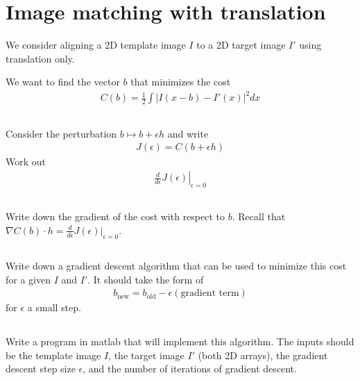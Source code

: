 \documentclass[17pt,landscape]{extarticle}
\begin{document}
\section{Image matching with translation}

We consider aligning a 2D template image $I$ to a 2D target image $I'$ using translation only.

We want to find the vector $b$ that minimizes the cost
\begin{align*}
C(b) = \frac12 \int |I(x - b)  - I'(x)|^2 dx
\end{align*}

\subsection{}
Consider the perturbation $b \mapsto b + \epsilon h$ and write
\begin{align*}
J(\epsilon) = C(b + \epsilon h)
\end{align*}
Work out
\begin{align*}
\left. \frac{d}{d\epsilon}  J(\epsilon ) \right|_{\epsilon = 0}
\end{align*}

\subsection{}
Write down the gradient of the cost with respect to $b$.  Recall that $\nabla C(b) \cdot h = \frac{d}{d\epsilon} J(\epsilon)\big|_{\epsilon = 0}$.  

\subsection{}

Write down a gradient descent algorithm that can be used to minimize this cost for a given $I$ and $I'$.  It should take the form of
\begin{align*}
b_{\text{new}} = b_{\text{old}} - \epsilon\left( \text{gradient term} \right)
\end{align*}
for $\epsilon$ a small step.

\subsection{}
Write a program in matlab that will implement this algorithm.  The inputs should be the template image $I$, the target image $I'$ (both 2D arrays), the gradient descent step size $\epsilon$, and the number of iterations of gradient descent.
\end{document}
